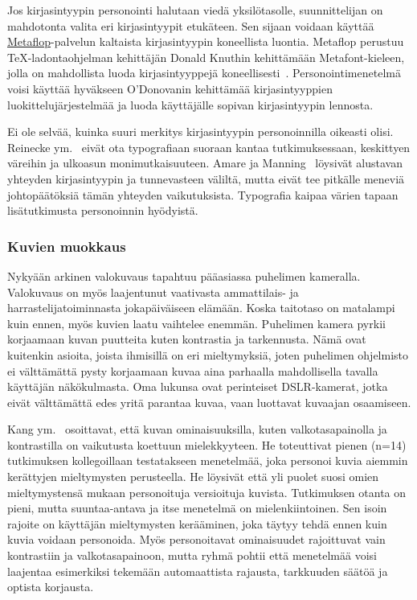 \documentclass[finnish, 12pt, a4paper, elec, utf8, a-1b, online]{aaltothesis}
\begin{document}
Jos kirjasintyypin personointi halutaan viedä yksilötasolle, suunnittelijan on
mahdotonta valita eri kirjasintyypit etukäteen. Sen sijaan voidaan käyttää
\href{https://www.metaflop.com/}{Metaflop}-palvelun kaltaista kirjasintyypin
koneellista luontia. Metaflop perustuu TeX-ladontaohjelman kehittäjän Donald
Knuthin kehittämään Metafont-kieleen, jolla on mahdollista luoda
kirjasintyyppejä koneellisesti~\cite{knuth_1986}. Personointimenetelmä voisi
käyttää hyväkseen O'Donovanin kehittämää kirjasintyyppien luokittelujärjestelmää
ja luoda käyttäjälle sopivan kirjasintyypin lennosta.

Ei ole selvää, kuinka suuri merkitys kirjasintyypin personoinnilla oikeasti
olisi. Reinecke ym.~\cite{10.1145/2556288.2557052} eivät ota typografiaan
suoraan kantaa tutkimuksessaan, keskittyen väreihin ja ulkoasun
monimutkaisuuteen. Amare ja Manning~\cite{10.1109/IPCC.2012.6408605} löysivät
alustavan yhteyden kirjasintyypin ja tunnevasteen väliltä, mutta eivät tee
pitkälle meneviä johtopäätöksiä tämän yhteyden vaikutuksista. Typografia kaipaa
värien tapaan lisätutkimusta personoinnin hyödyistä.

\subsubsection{Kuvien muokkaus}

Nykyään arkinen valokuvaus tapahtuu pääasiassa puhelimen kameralla. Valokuvaus
on myös laajentunut vaativasta ammattilais- ja harrastelijatoiminnasta
jokapäiväiseen elämään. Koska taitotaso on matalampi kuin ennen, myös kuvien
laatu vaihtelee enemmän. Puhelimen kamera pyrkii korjaamaan kuvan puutteita
kuten kontrastia ja tarkennusta. Nämä ovat kuitenkin asioita, joista ihmisillä
on eri mieltymyksiä, joten puhelimen ohjelmisto ei välttämättä pysty korjaamaan
kuvaa aina parhaalla mahdollisella tavalla käyttäjän näkökulmasta. Oma lukunsa
ovat perinteiset DSLR-kamerat, jotka eivät välttämättä edes yritä parantaa
kuvaa, vaan luottavat kuvaajan osaamiseen.

Kang ym.~\cite{5539850} osoittavat, että kuvan ominaisuuksilla, kuten
valkotasapainolla ja kontrastilla on vaikutusta koettuun mielekkyyteen. He
toteuttivat pienen (n=14) tutkimuksen kollegoillaan testatakseen menetelmää,
joka personoi kuvia aiemmin kerättyjen mieltymysten perusteella. He löysivät
että yli puolet suosi omien mieltymystensä mukaan personoituja versioituja
kuvista. Tutkimuksen otanta on pieni, mutta suuntaa-antava ja itse menetelmä on
mielenkiintoinen. Sen isoin rajoite on käyttäjän mieltymysten kerääminen, joka
täytyy tehdä ennen kuin kuvia voidaan personoida. Myös personoitavat
ominaisuudet rajoittuvat vain kontrastiin ja valkotasapainoon, mutta ryhmä
pohtii että menetelmää voisi laajentaa esimerkiksi tekemään automaattista
rajausta, tarkkuuden säätöä ja optista korjausta.
\end{document}
